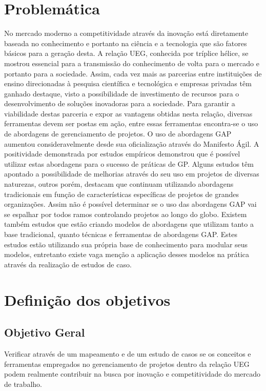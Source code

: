\section{Problemática}

No mercado moderno a competitividade através da inovação está diretamente baseada no conhecimento e portanto na ciência e a tecnologia que são fatores básicos para a geração desta. A relação UEG, conhecida por tríplice hélice, se mostrou essencial para a transmissão do conhecimento de volta para o mercado e portanto para a sociedade.
Assim, cada vez mais as parcerias entre instituições de ensino direcionadas à pesquisa científica e tecnológica e empresas privadas têm ganhado destaque, visto a possibilidade de investimento de recursos para o desenvolvimento de soluções inovadoras para a sociedade.
Para garantir a viabilidade destas parceria e expor as vantagens obtidas nesta relação, diversas ferramentas devem ser postas em ação, entre essas ferramentas encontra-se o uso de abordagens de gerenciamento de projetos.
O uso de abordagens GAP aumentou consideravelmente desde sua oficialização através do Manifesto Ágil. A positividade demonstrada por estudos empíricos demonstrou que é possível utilizar estas abordagens para o sucesso de práticas de GP.
Alguns estudos têm apontado a possibilidade de melhorias através do seu uso em projetos de diversas naturezas, outros porém, destacam que continuam utilizando abordagens tradicionais em função de características específicas de projetos de grandes organizações. Assim não é possível determinar se o uso das abordagens GAP vai se espalhar por todos ramos controlando projetos ao longo do globo.
Existem também estudos que estão criando modelos de abordagens que utilizam tanto a base tradicional, quanto técnicas e ferramentas de abordagens GAP. Estes estudos estão utilizando sua própria base de conhecimento para modular seus modelos, entretanto existe vaga menção a aplicação desses modelos na prática através da realização de estudos de caso.


\section{Definição dos objetivos}

\subsection{Objetivo Geral}

Verificar através de um mapeamento e de um estudo de casos se os conceitos e ferramentas empregados no gerenciamento de projetos dentro da relação UEG podem realmente contribuir na busca por inovação e competitividade do mercado de trabalho.


